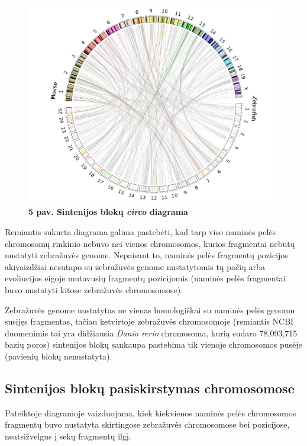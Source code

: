 \documentclass[12pt]{article}
\begin{document}
\begin{figure}[htb]
    \begin{center}
        \includegraphics[width=0.8\linewidth]{../Figures/SynCircos.png}
        \vspace{-1\baselineskip}
        \caption*{\small\textbf{5 pav. Sintenijos blokų \emph{circo}
        diagrama}}
        \label{fig:5}
    \end{center}
\end{figure}

Remiantis sukurta diagrama galima pastebėti, kad tarp viso naminės pelės
chromosomų rinkinio nebuvo nei vienos chromosomos, kurios fragmentai nebūtų
nustatyti zebražuvės genome. Nepaisant to, naminės pelės fragmentų
pozicijos akivaizdžiai nesutapo su zebražuvės genome nustatytomis tų pačių
arba evoliucijos eigoje mutavusių fragmentų pozicijomis (naminės pelės
fragmentai buvo nustatyti kitose zebražuvės chromosomose).

Zebražuvės genome nustatytas ne vienas homologiškai su naminės pelės genomu
susijęs fragmentas, tačiau ketvirtoje zebražuvės chromosomoje (remiantis
NCBI\cite{NCBI} duomenimis tai yra didžiausia \emph{Danio rerio} chromosoma,
kurią sudaro 78,093,715 bazių poros) sintenijos blokų sankaupa pastebima
tik vienoje chromosomos pusėje (pavienių blokų nenustatyta).

\subsection{Sintenijos blokų pasiskirstymas chromosomose}
Pateiktoje diagramoje vaizduojama, kiek kiekvienos naminės pelės chromosomos
fragmentų buvo nustatyta skirtingose zebražuvės chromosomose bei pozicijose,
neatsižvelgus į sekų fragmentų ilgį.
\end{document}
